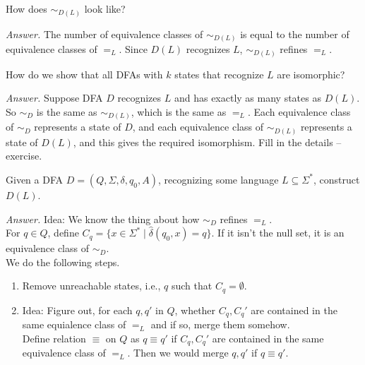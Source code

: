 \documentclass[a4paper]{article}
\newenvironment{ans}{\begin{breakbox}\textit{Answer.}}{\end{breakbox}}
\newcommand{\nl}{\vspace{0.2cm}\\}
\newcommand{\hd}{\hat{\delta}}
\begin{document}
\begin{ques}
    How does $\sim_{D(L)}$ look like?
\end{ques}

\begin{ans}
    The number of equivalence classes of $\sim_{D(L)}$ is equal to the number of equivalence classes of $=_L$. Since $D(L)$ recognizes $L$, $\sim_{D(L)}$ refines $=_L$.
\end{ans}

\begin{ques}
    How do we show that all DFAs with $k$ states that recognize $L$ are isomorphic?
\end{ques}

\begin{ans}
    Suppose DFA $D$ recognizes $L$ and has exactly as many states as $D(L)$. So $\sim_D$ is the same as $\sim_{D(L)}$, which is the same as $=_L$.
    Each equivalence class of $\sim_D$ represents a state of $D$, and each equivalence class of $\sim_{D(L)}$ represents a state of $D(L)$, and this gives the required isomorphism. Fill in the
    details -- exercise.
\end{ans}

\begin{ques}
    Given a DFA $D = (Q, \Sigma, \delta, q_0, A)$, recognizing some language $L \subseteq \Sigma^*$, construct $D(L)$.
\end{ques}

\begin{ans}
    Idea: We know the thing about how $\sim_D$ refines $=_L$.\nl
    For $q \in Q$, define $C_q = \{x \in \Sigma^* \mid \hd(q_0, x) = q\}$. If it isn't the null set, it is an equivalence class of $\sim_D$.\nl
    We do the following steps.
    \begin{enumerate}
        \item Remove unreachable states, i.e., $q$ such that $C_q = \emptyset$.
        \item Idea: Figure out, for each $q, q'$ in $Q$, whether $C_q, C_q'$ are contained in the same equialence class of $=_L$ and if so, merge them somehow.\nl
            Define relation $\equiv$ on $Q$ as $q \equiv q'$ if $C_q, C_q'$ are contained in the same equivalence class of $=_L$. Then we would merge $q, q'$ if $q \equiv q'$.
    \end{enumerate}
\end{ans}
\end{document}
